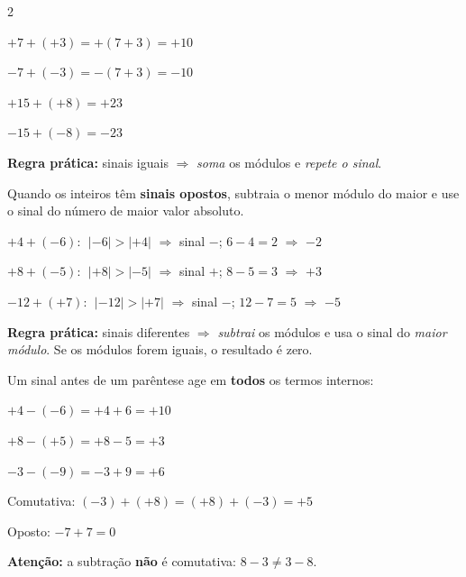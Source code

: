 \documentclass[12pt,twoside]{article}
\begin{document}
\begin{multicols}{2}

$+7 + (+3) = +(7+3) = +10$

$-7 + (-3) = -(7+3) = -10$

$+15 + (+8) = +23$

$-15 + (-8) = -23$

\vspace{4pt}
\textbf{Regra prática:} sinais iguais $\Rightarrow$ \emph{soma} os módulos e \emph{repete o sinal}.


Quando os inteiros têm \textbf{sinais opostos}, subtraia o menor módulo do maior e use o sinal do número de maior valor absoluto.


$+4 + (-6)$: $\;|-6| > |+4|$ $\Rightarrow$ sinal $-$;\; $6-4=2$ $\Rightarrow$ $-2$

$+8 + (-5)$: $\;|+8| > |-5|$ $\Rightarrow$ sinal $+$;\; $8-5=3$ $\Rightarrow$ $+3$

$-12 + (+7)$: $\;|-12| > |+7|$ $\Rightarrow$ sinal $-$;\; $12-7=5$ $\Rightarrow$ $-5$

\vspace{4pt}
\textbf{Regra prática:} sinais diferentes $\Rightarrow$ \emph{subtrai} os módulos e usa o sinal do \emph{maior módulo}. Se os módulos forem iguais, o resultado é zero.


Um sinal antes de um parêntese age em \textbf{todos} os termos internos:



$+4 - (-6) = +4 + 6 = +10$

$+8 - (+5) = +8 - 5 = +3$

$-3 - (-9) = -3 + 9 = +6$




Comutativa: $(-3) + (+8) = (+8) + (-3) = +5$ \checkmark

Oposto: $-7 + 7 = 0$ \checkmark

\vspace{4pt}
\textbf{Atenção:} a subtração \textbf{não} é comutativa: $8 - 3 \neq 3 - 8$.


\end{multicols}
\end{document}
